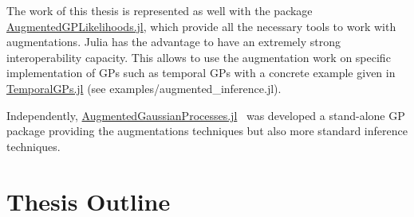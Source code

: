 The work of this thesis is represented as well with the package \href{https://github.com/JuliaGaussianProcesses/AugmentedGPLikelihoods.jl}{AugmentedGPLikelihoods.jl}, which provide all the necessary tools to work with augmentations.
Julia has the advantage to have an extremely strong interoperability capacity.
This allows to use the augmentation work on specific implementation of \ac{GPs} such as temporal \ac{GPs} with a concrete example given in \href{https://github.com/JuliaGaussianProcesses/TemporalGPs.jl}{TemporalGPs.jl} (see examples/augmented\_inference.jl).

Independently, \href{https://github.com/theogf/AugmentedGaussianProcesses.jl}{AugmentedGaussianProcesses.jl}~\cite{theo_galy_fajou_2021_5728215} was developed a stand-alone \ac{GP} package providing the augmentations techniques but also more standard inference techniques. 

\section{Thesis Outline}

